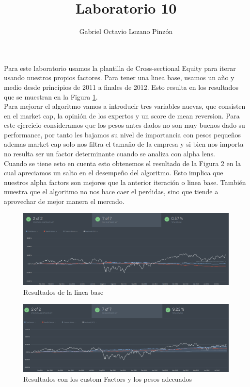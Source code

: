 \documentclass[12pt,a4paper]{article}
\author{Gabriel Octavio Lozano Pinzón}
\title{Laboratorio 10}
\begin{document}
\maketitle
Para este laboratorio usamos la plantilla de Cross-sectional Equity para iterar usando nuestros propios factores. Para tener una linea base, usamos un año y medio desde principios de 2011 a finales de 2012. Esto resulta en los resultados que se muestran en la Figura \ref{fig:lineabase}.\\

Para mejorar el algoritmo vamos a introducir tres variables nuevas, que consisten en el market cap, la opinión de los expertos y un score de mean reversion. Para este ejercicio consideramos que los pesos antes dados no son muy buenos dado su performance, por tanto les bajamos su nivel de importancia con pesos pequeños ademas market cap solo nos filtra el tamaño de la empresa y si bien nos importa no resulta ser un factor determinante cuando se analiza con alpha lens.\\

Cuando se tiene esto en cuenta esto obtenemos el resultado de la Figura 2 en la cual apreciamos un salto en el desempeño del algoritmo. Esto implica que nuestros alpha factors son mejores que la anterior iteración o linea base.  También muestra que el algoritmo no nos hace caer el perdidas, sino que tiende a aprovechar de mejor manera el mercado. \\


\begin{figure}
	\centering
	\includegraphics[width=1\linewidth]{linea_base}
	\caption{Resultados de la linea base}
	\label{fig:lineabase}
\end{figure}
\begin{figure}
	\centering
	\includegraphics[width=0.7\linewidth]{fase_final}
	\caption{Resultados con los custom Factors y los pesos adecuados}
	\label{fig:fasefinal}
\end{figure}
\end{document}
